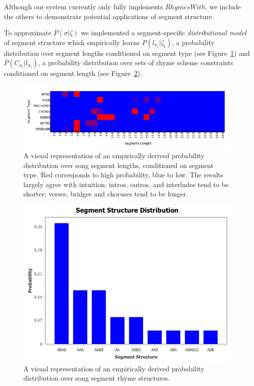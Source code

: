 \documentclass[letterpaper]{article}
\begin{document}
Although our system currently only fully implements $RhymesWith$, we include the others to demonstrate potential applications of segment structure.

To approximate $P(\sigma|\zeta)$ we implemented a segment-specific \emph{distributional model} of segment structure which empirically learns $P(l_{\sigma_i}|\zeta_i)$, a probability distribution over segment lengths conditioned on segment type (see Figure~\ref{fig:measure_count_by_segment}) and $P(C_{\sigma_i} | l_{\sigma_i})$, a probability distribution over sets of rhyme scheme constraints conditioned on segment length (see Figure~\ref{fig:segment_structure}).

\begin{figure}
	\centering
	\includegraphics[width=\linewidth]{measure_count_by_segment}
	\caption{\label{fig:measure_count_by_segment} A visual representation of an empirically derived probability distribution over song segment lengths, conditioned on segment type. Red corresponds to high probability, blue to low. The results largely agree with intuition: intros, outros, and interludes tend to be shorter; verses, bridges and choruses tend to be longer.}
\end{figure}

\begin{figure}
	\centering
	\includegraphics[width=\linewidth]{segment_structure}
	\caption{\label{fig:segment_structure} A visual representation of an empirically derived probability distribution over song segment rhyme structures.}
\end{figure}
\end{document}
